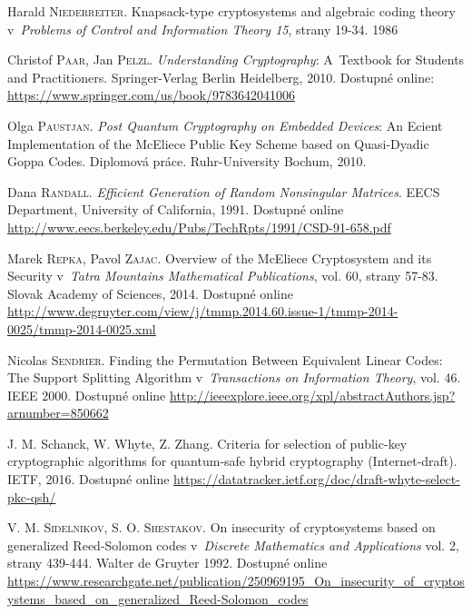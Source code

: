 \documentclass[thesis=M,czech,hidelinks]{FITthesis}[2012/06/26]
\newcommand{\0}{{\textcolor[gray]{0.80}{0}}}
\begin{document}
\begin{thebibliography}{99}
        Harald \textsc{Niederreiter}. Knapsack-type cryptosystems and
        algebraic coding theory v~\emph{Problems of Control and Information
        Theory 15}, strany 19-34. 1986

        Christof \textsc{Paar}, Jan \textsc{Pelzl}. \emph{Understanding
        Cryptography}: A~Textbook for Students and Practitioners.
        Springer-Verlag Berlin Heidelberg, 2010. Dostupné
        online: \url{https://www.springer.com/us/book/9783642041006}

        Olga \textsc{Paustjan}. \emph{Post Quantum Cryptography on Embedded
        Devices}: An Ecient Implementation of the McEliece Public Key Scheme
        based on Quasi-Dyadic Goppa Codes. Diplomová práce. Ruhr-University
        Bochum, 2010.


        Dana \textsc{Randall}. \emph{Efficient Generation of Random Nonsingular
        Matrices}. EECS Department, University of California, 1991. Dostupné
        online
        \url{http://www.eecs.berkeley.edu/Pubs/TechRpts/1991/CSD-91-658.pdf}

        Marek \textsc{Repka}, Pavol \textsc{Zajac}. Overview of the McEliece
        Cryptosystem and its Security v~\emph{Tatra Mountains Mathematical
        Publications}, vol. 60, strany 57-83. Slovak Academy of Sciences, 2014.
        Dostupné online
        \url{http://www.degruyter.com/view/j/tmmp.2014.60.issue-1/tmmp-2014-0025/tmmp-2014-0025.xml}

        Nicolas \textsc{Sendrier}. Finding the Permutation Between Equivalent
        Linear Codes: The Support Splitting Algorithm v~\emph{Transactions on
        Information Theory}, vol. 46. IEEE 2000. Dostupné online
        \url{http://ieeexplore.ieee.org/xpl/abstractAuthors.jsp?arnumber=850662}

        J. M. Schanck, W. Whyte, Z. Zhang. Criteria for selection of public-key
        cryptographic algorithms for quantum-safe hybrid cryptography
        (Internet-draft). IETF, 2016. Dostupné online
        \url{https://datatracker.ietf.org/doc/draft-whyte-select-pkc-qsh/}

        V. M. \textsc{Sidelnikov}, S. O. \textsc{Shestakov}. On insecurity of
        cryptosystems based on generalized Reed-Solomon codes v~\emph{Discrete
        Mathematics and Applications} vol. 2, strany 439-444. Walter de Gruyter
        1992. Dostupné online
        \url{https://www.researchgate.net/publication/250969195\_On\_insecurity\_of\_cryptosystems\_based\_on\_generalized\_Reed-Solomon\_codes}


\end{thebibliography}
\end{document}
